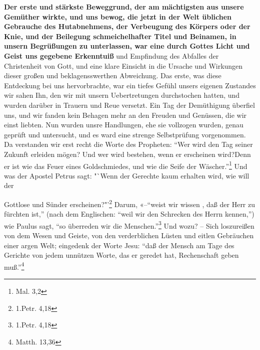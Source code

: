 \textbf{Der erste und stärkste Beweggrund, der am mächtigsten aus unsere Gemüther
wirkte, und uns bewog, die jetzt in der Welt üblichen Gebrauche des
Hutabnehmens, der Verbeugung des Körpers oder der Knie, und der Beilegung
schmeichelhafter Titel und Beinamen, in unsern Begrüßungen zu unterlassen, war
eine durch Gottes Licht und Geist uns gegebene Erkenntuiß} und Empfindung des
Abfalles der Christenheit von Gott, und eine klare Einsicht in die Ursache und
Wirkungen dieser großen und beklagensswerthen Abweichung. Das erste, was diese
Entdeckung bei uns hervorbrachte, war ein tiefes Gefühl unsers eigenen Zustandes
wir sahen Ihn, den wir mit unsern Uebertretungen durchstochen hatten, und wurden
darüber in Trauern und Reue versetzt. Ein Tag der Demüthigung überfiel uns, und
wir fanden kein Behagen mehr an den Freuden und Genüssen, die wir einst liebten.
Nun wurden unsre Handlungen, ehe sie vollzogen wurden, genau geprüft und
untersucht, und es ward eine strenge Selbstprüfung vorgenommen. Da verstanden
wir erst recht die Worte des Propheten: "`Wer wird den Tag seiner Zukunft
erleiden mögen? Und wer wird bestehen, wenn er erscheinen wird?Denn er ist wie
das Feuer eines Goldschmiedes, und wie die Seife der Wäscher."'\footnote{Mal.
3,2} Und was der Apostel Petrus sagt: "`Wenn der Gerechte kaum erhalten wird,
wie will der

\medskip

Gottlose und Sünder erscheinen?"'\footnote{1.Petr. 4,18} Darum, «--"`weist wir
wissen , daß der Herr zu fürchten ist,"' (nach dem Englischen: "`weil wir den
Schrecken des Herrn kennen,"') wie Paulus sagt, "`so überreden wir die
Menschen."'\footnote{1.Petr. 4,18} Und wozu? -- Sich loszureißen von dem Wesen
und Geiste, von den verderblichen Lüsten und eitlen Gebräuchen einer argen Welt;
eingedenk der Worte Jesu: "`daß der Mensch am Tage des Gerichte von jedem
unnützen Worte, das er geredet hat, Rechenschaft geben muß."'\footnote{Matth.
13,36}

\medskip

